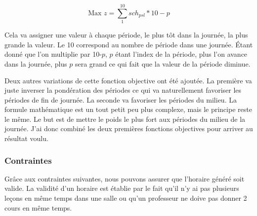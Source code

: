 \begin{equation*}
\text{Max } z = \sum_{1}^{10} sch_{psl} * 10-p
\end{equation*}

Cela va assigner une valeur à chaque période, le plus tôt dans la journée, la plus grande la valeur. Le 10 correspond au nombre de période dans une journée. Étant donné que l'on multiplie par 10-$p$, $p$ étant l'index de la période, plus l'on avance dans la journée, plus $p$ sera grand ce qui fait que la valeur de la période diminue.

Deux autres variations de cette fonction objective ont été ajoutée. La première va juste inverser la pondération des périodes ce qui va naturellement favoriser les périodes de fin de journée. La seconde va favoriser les périodes du milieu. La formule mathématique est un tout petit peu plus complexe, mais le principe reste le même. Le but est de mettre le poids le plus fort aux périodes du milieu de la journée. J'ai donc combiné les deux premières fonctions objectives pour arriver au résultat voulu.

\subsubsection{Contraintes}

Grâce aux contraintes suivantes, nous pouvons assurer que l'horaire généré soit valide. La validité d'un horaire est établie par le fait qu'il n'y ai pas plusieurs leçons en même temps dans une salle ou qu'un professeur ne doive pas donner 2 cours en même temps.

